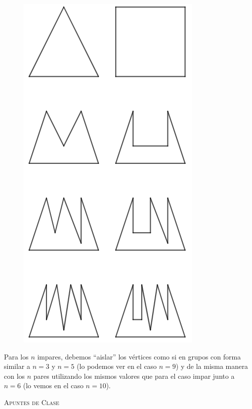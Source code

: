 \begin{enumerate}
	\begin{figure}[H]
		\centering
		\includegraphics[scale=0.4]{images/grafos_poligonos_poliedros/triang_unica.png}
	\end{figure}
	
	Para los $n$ impares, debemos ``aislar'' los vértices como si en grupos con forma similar a $n=3$ y $n=5$ (lo podemos ver en el caso $n=9$) y de la misma manera con los $n$ pares utilizando los mismos valores que para el caso impar junto a $n=6$ (lo vemos en el caso $n=10$).
	
	
	
	
\end{enumerate}


\newpage
\begin{thebibliography}{X}

 \textsc{Apuntes de Clase}

\end{thebibliography}





